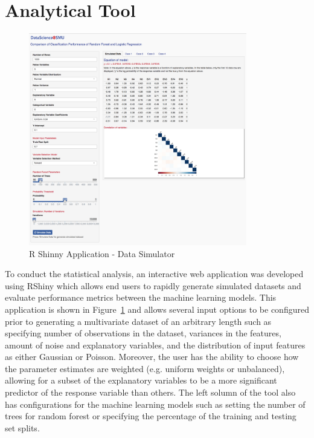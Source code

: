\documentclass{llncs}
\begin{document}
\section{Analytical Tool}

\begin{figure}
\centering
\includegraphics[width=0.85\textwidth]{full-tool.png}
\caption{R Shinny Application - Data Simulator}
\label{fig:rshiny}
\end{figure}

To conduct the statistical analysis, an interactive web application was developed using RShiny which allows end users to rapidly generate simulated datasets and evaluate performance metrics between the machine learning models. This application is shown in Figure~\ref{fig:rshiny} and allows several input options to be configured prior to generating a multivariate dataset of an arbitrary length such as specifying number of observations in the dataset, variances in the features, amount of noise and explanatory variables, and the distribution of input features as either Gaussian or Poisson. Moreover, the user has the ability to choose how the parameter estimates are weighted (e.g. uniform weights or unbalanced), allowing for a subset of the explanatory variables to be a more significant predictor of the response variable than others. The left solumn of the tool also has configurations for the machine learning models such as setting the number of trees for random forest or specifying the percentage of the training and testing set splits.
\end{document}
